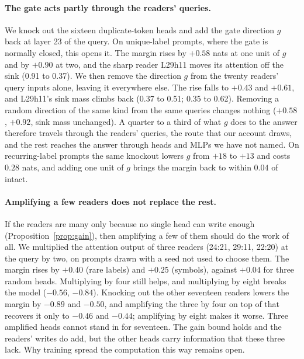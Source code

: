 \documentclass{article}
\newcommand{\head}[2]{L#1h#2}
\begin{document}
\paragraph{The gate acts partly through the readers' queries.} We knock out the sixteen duplicate-token heads and add the gate direction $g$ back at layer 23 of the query. On unique-label prompts, where the gate is normally closed, this opens it. The margin rises by $+0.58$ nats at one unit of $g$ and by $+0.90$ at two, and the sharp reader \head{29}{11} moves its attention off the sink (0.91 to 0.37). We then remove the direction $g$ from the twenty readers' query inputs alone, leaving it everywhere else. The rise falls to $+0.43$ and $+0.61$, and \head{29}{11}'s sink mass climbs back (0.37 to 0.51; 0.35 to 0.62). Removing a random direction of the same kind from the same queries changes nothing ($+0.58$, $+0.92$, sink mass unchanged). A quarter to a third of what $g$ does to the answer therefore travels through the readers' queries, the route that our account draws, and the rest reaches the answer through heads and MLPs we have not named. On recurring-label prompts the same knockout lowers $g$ from $+18$ to $+13$ and costs $0.28$ nats, and adding one unit of $g$ brings the margin back to within $0.04$ of intact.

\paragraph{Amplifying a few readers does not replace the rest.} If the readers are many only because no single head can write enough (Proposition~\ref{prop:gain}), then amplifying a few of them should do the work of all. We multiplied the attention output of three readers (24:21, 29:11, 22:20) at the query by two, on prompts drawn with a seed not used to choose them. The margin rises by $+0.40$ (rare labels) and $+0.25$ (symbols), against $+0.04$ for three random heads. Multiplying by four still helps, and multiplying by eight breaks the model ($-0.56$, $-0.84$). Knocking out the other seventeen readers lowers the margin by $-0.89$ and $-0.50$, and amplifying the three by four on top of that recovers it only to $-0.46$ and $-0.44$; amplifying by eight makes it worse. Three amplified heads cannot stand in for seventeen. The gain bound holds and the readers' writes do add, but the other heads carry information that these three lack. Why training spread the computation this way remains open.
\end{document}
